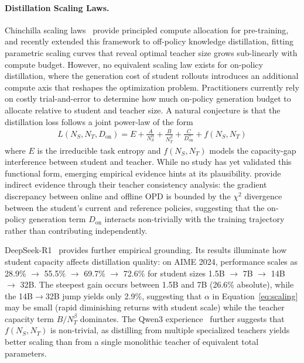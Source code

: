 \documentclass{article} %
\begin{document}
\paragraph{Distillation Scaling Laws.}
Chinchilla scaling laws~\citep{2203.15556} provide principled compute allocation for pre-training, and \citet{2502.08606} recently extended this framework to off-policy knowledge distillation, fitting parametric scaling curves that reveal optimal teacher size grows sub-linearly with compute budget. However, no equivalent scaling law exists for on-policy distillation, where the generation cost of student rollouts introduces an additional compute axis that reshapes the optimization problem. Practitioners currently rely on costly trial-and-error to determine how much on-policy generation budget to allocate relative to student and teacher size. A natural conjecture is that the distillation loss follows a joint power-law of the form
\begin{align}
L(N_S, N_T, D_{\text{on}}) = E + \frac{A}{N_S^\alpha} + \frac{B}{N_T^\beta} + \frac{C}{D_{\text{on}}^\gamma} + f(N_S, N_T) \label{eq:scaling}
\end{align}
where $E$ is the irreducible task entropy and $f(N_S, N_T)$ models the capacity-gap interference between student and teacher. While no study has yet validated this functional form, emerging empirical evidence hints at its plausibility. \citet{wu2026lightning} provide indirect evidence through their teacher consistency analysis: the gradient discrepancy between online and offline OPD is bounded by the $\chi^2$ divergence between the student's current and reference policies, suggesting that the on-policy generation term $D_{\text{on}}$ interacts non-trivially with the training trajectory rather than contributing independently.

DeepSeek-R1~\citep{2501.12948} provides further empirical grounding. Its results illuminate how student capacity affects distillation quality: on AIME 2024, performance scales as 28.9\% $\to$ 55.5\% $\to$ 69.7\% $\to$ 72.6\% for student sizes 1.5B $\to$ 7B $\to$ 14B $\to$ 32B. The steepest gain occurs between 1.5B and 7B (26.6\% absolute), while the 14B$\to$32B jump yields only 2.9\%, suggesting that $\alpha$ in Equation~\ref{eq:scaling} may be small (rapid diminishing returns with student scale) while the teacher capacity term $B/N_T^\beta$ dominates. The Qwen3 experience~\citep{2505.09388} further suggests that $f(N_S, N_T)$ is non-trivial, as distilling from multiple specialized teachers yields better scaling than from a single monolithic teacher of equivalent total parameters.
\end{document}
